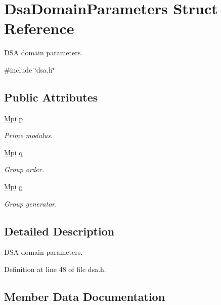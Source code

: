 \hypertarget{structDsaDomainParameters}{}\section{Dsa\+Domain\+Parameters Struct Reference}
\label{structDsaDomainParameters}


D\+SA domain parameters.  




{\ttfamily \#include \char`\"{}dsa.\+h\char`\"{}}

\subsection*{Public Attributes}
\begin{DoxyCompactItemize}
\item 
\hyperlink{structMpi}{Mpi} \hyperlink{structDsaDomainParameters_a651791ea6179f2fa29caa4e8f7870bf8}{p}
\begin{DoxyCompactList}\small\item\em Prime modulus. \end{DoxyCompactList}\item 
\hyperlink{structMpi}{Mpi} \hyperlink{structDsaDomainParameters_aa9078cd4d84fbe43a0661f9b50b78894}{q}
\begin{DoxyCompactList}\small\item\em Group order. \end{DoxyCompactList}\item 
\hyperlink{structMpi}{Mpi} \hyperlink{structDsaDomainParameters_a4c63bdcea59ab75967b3a4cff15ed3c9}{g}
\begin{DoxyCompactList}\small\item\em Group generator. \end{DoxyCompactList}\end{DoxyCompactItemize}


\subsection{Detailed Description}
D\+SA domain parameters. 

Definition at line 48 of file dsa.\+h.



\subsection{Member Data Documentation}
\mbox{\label{structDsaDomainParameters_a4c63bdcea59ab75967b3a4cff15ed3c9}} 
